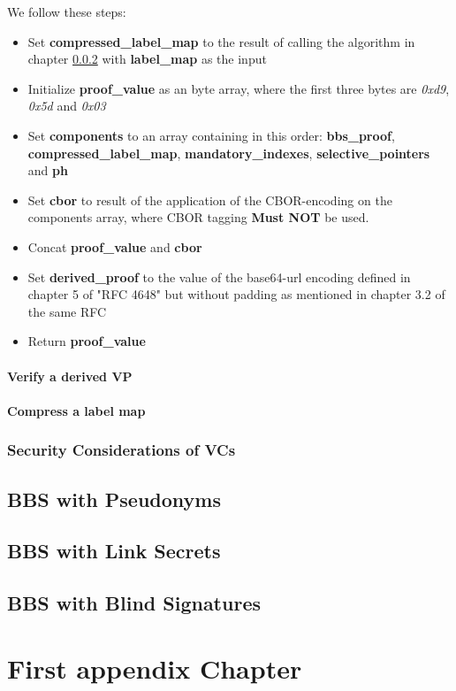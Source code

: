 \documentclass[
	a4paper               %
	,bibliography=totoc   %
	,listof=totoc         %
	,monolingual
	twoside=false,
]{bfhthesis}              %
\begin{document}
We follow these steps:
\begin{itemize}
	\item Set \textbf{compressed\_label\_map} to the result of calling the algorithm in chapter \ref{subsub:compresslabelmap} with \textbf{label\_map} as the input
	\item Initialize \textbf{proof\_value} as an byte array, where the first three bytes are \textit{0xd9}, \textit{0x5d} and \textit{0x03}
	\item Set \textbf{components} to an array containing in this order: \textbf{bbs\_proof}, \textbf{compressed\_label\_map}, \textbf{mandatory\_indexes}, \textbf{selective\_pointers} and \textbf{ph}
	\item Set \textbf{cbor} to result of the application of the CBOR-encoding\cite{cbor} on the components array, where CBOR tagging \textbf{Must NOT} be used.
	\item Concat \textbf{proof\_value} and \textbf{cbor}
	\item Set \textbf{derived\_proof} to the value of the base64-url encoding defined in chapter 5 of "RFC 4648"\cite{base64} but without padding as mentioned in chapter 3.2 of the same RFC
	\item Return \textbf{proof\_value}
\end{itemize}

\subsubsection{Verify a derived VP}
\label{subsub:verifyderivedvp}

\subsubsection{Compress a label map}
\label{subsub:compresslabelmap}

\subsection{Security Considerations of VCs}
\label{subsec:vcseccons}

\section{BBS with Pseudonyms}
\label{chap:Pseudonyms}

\section{BBS with Link Secrets}
\label{chap:linksecrets}

\section{BBS with Blind Signatures}
\label{chap:blindsignatures}




\appendix


\chapter{First appendix Chapter}





\end{document}
